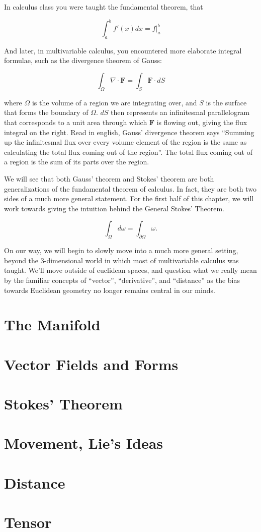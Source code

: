 \documentclass[../master.tex]{subfiles}
\begin{document}
In calculus class you were taught the fundamental theorem, that

	\begin{equation}
		\int_a^b f'(x) dx = f\rvert^b_a
	\end{equation}

And later, in multivariable calculus, you encountered more elaborate integral formulae, such as the divergence theorem of Gauss:

	\begin{equation}
		\int_\Omega \nabla \cdot \mathbf{F} = \int_S \mathbf{F} \cdot dS
	\end{equation}

	where $\Omega$ is the volume of a region we are integrating over, and $S$ is the surface that forms the boundary of $\Omega$. $dS$ then represents an infinitesmal parallelogram that corresponds to a unit area through which $\mathbf{F}$ is flowing out, giving the flux integral on the right. Read in english, Gauss' divergence theorem says ``Summing up the infinitesmal flux over every volume element of the region is the same as calculating the total flux coming out of the region''. The total flux coming out of a region is the sum of its parts over the region.
	
	We will see that both Gauss' theorem and Stokes' theorem are both generalizations of the fundamental theorem of calculus. In fact, they are both two sides of a much more general statement. For the first half of this chapter, we will work towards giving the intuition behind the General Stokes' Theorem.
	
	\begin{equation}
		\int_\Omega d\omega = \int_{\partial \Omega} \omega.
	\end{equation}
	
	On our way, we will begin to slowly move into a much more general setting, beyond the $3$-dimensional world in which most of multivariable calculus was taught. We'll move outside of euclidean spaces, and question what we really mean by the familiar concepts of ``vector'', ``derivative'', and ``distance'' as the bias towards Euclidean geometry no longer remains central in our minds.

\section{The Manifold}

\section{Vector Fields and Forms}

\section{Stokes' Theorem}

\section{Movement, Lie's Ideas}

\section{Distance}

\section{Tensor}
\end{document}
